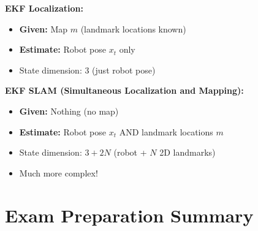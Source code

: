 \begin{tcolorbox}[colback=green!5!white,colframe=green!60!black]

\textbf{EKF Localization:}
\begin{itemize}
    \item \textbf{Given:} Map $m$ (landmark locations known)
    \item \textbf{Estimate:} Robot pose $x_t$ only
    \item State dimension: 3 (just robot pose)
\end{itemize}

\textbf{EKF SLAM (Simultaneous Localization and Mapping):}
\begin{itemize}
    \item \textbf{Given:} Nothing (no map)
    \item \textbf{Estimate:} Robot pose $x_t$ AND landmark locations $m$
    \item State dimension: $3 + 2N$ (robot + $N$ 2D landmarks)
    \item Much more complex!
\end{itemize}

\end{tcolorbox}

\section{Exam Preparation Summary}

